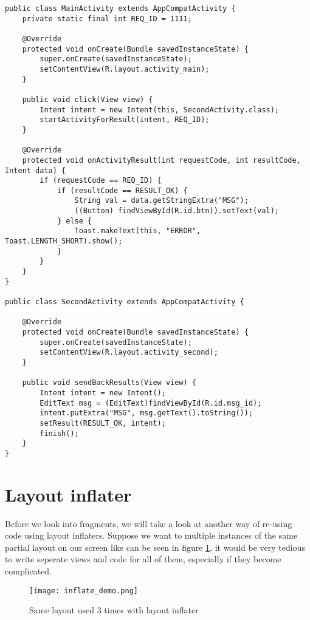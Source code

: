 \begin{lstlisting}[style=A_Java, caption={Start activity for result}, label={listing:javaforres}]
public class MainActivity extends AppCompatActivity {
    private static final int REQ_ID = 1111;

    @Override
    protected void onCreate(Bundle savedInstanceState) {
        super.onCreate(savedInstanceState);
        setContentView(R.layout.activity_main);
    }

    public void click(View view) {
        Intent intent = new Intent(this, SecondActivity.class);
        startActivityForResult(intent, REQ_ID);
    }

    @Override
    protected void onActivityResult(int requestCode, int resultCode, Intent data) {
        if (requestCode == REQ_ID) {
            if (resultCode == RESULT_OK) {
                String val = data.getStringExtra("MSG");
                ((Button) findViewById(R.id.btn)).setText(val);
            } else {
                Toast.makeText(this, "ERROR", Toast.LENGTH_SHORT).show();
            }
        }
    }
}

public class SecondActivity extends AppCompatActivity {

    @Override
    protected void onCreate(Bundle savedInstanceState) {
        super.onCreate(savedInstanceState);
        setContentView(R.layout.activity_second);
    }

    public void sendBackResults(View view) {
        Intent intent = new Intent();
        EditText msg = (EditText)findViewById(R.id.msg_id);
        intent.putExtra("MSG", msg.getText().toString());
        setResult(RESULT_OK, intent);
        finish();
    }
}
\end{lstlisting}

\section{Layout inflater}
Before we look into fragments, we will take a look at another way of re-using code using layout inflaters. Suppose we want to multiple instances of the same partial layout on our screen like can be seen in figure \ref{fig:infldem}, it would be very tedious to write seperate views and code for all of them, especially if they become complicated. 

\begin{figure}[H]
\centering
\texttt{[image: inflate\_demo.png]}
\caption{Same layout used 3 times with layout inflater}
\label{fig:infldem}
\end{figure}

